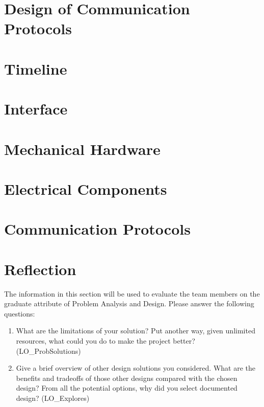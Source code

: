 \documentclass[12pt, titlepage]{article}
\begin{document}
\section{Design of Communication Protocols}


\section{Timeline}


% 

\newpage{}

\appendix

\section{Interface}


\section{Mechanical Hardware}

\section{Electrical Components}

\section{Communication Protocols}

\section{Reflection}

The information in this section will be used to evaluate the team members on the
graduate attribute of Problem Analysis and Design.  Please answer the following questions:

\begin{enumerate}
  \item What are the limitations of your solution?  Put another way, given
  unlimited resources, what could you do to make the project better? (LO\_ProbSolutions)
  \item Give a brief overview of other design solutions you considered.  What
  are the benefits and tradeoffs of those other designs compared with the chosen
  design?  From all the potential options, why did you select documented design?
  (LO\_Explores)
\end{enumerate}
\end{document}

